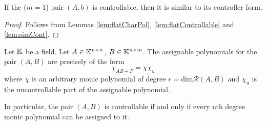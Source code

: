 \begin{cor}
\label{cor:controllerForm}
    If the  ($m=1$) pair $(A,b)$ is controllable, then it is similar to its controller form.
\end{cor}

\begin{proof}
    Follows from Lemmas \ref{lem:flatCharPol}, \ref{lem:flatControllable} and \ref{lem:simCont}. 
\end{proof}

\begin{theorem}
    Let $\mathbb{K}$ be a field. Let $A\in\mathbb{K}^{n\times n}$, $B\in\mathbb{K}^{n\times m}$. The assignable polynomials for the pair $(A,B)$ are precisely of the form $$\chi_{AB+F}=\chi\chi_u$$ where $\chi$ is an arbitrary monic polynomial of degree $r=\text{dim}\mathcal{R}(A,B)$ and $\chi_u$ is the uncontrollable part of the assignable polynomial.

    In particular, the pair $(A,B)$ is controllable if and only if every nth degree monic polynomial can be assigned to it.
\end{theorem}

